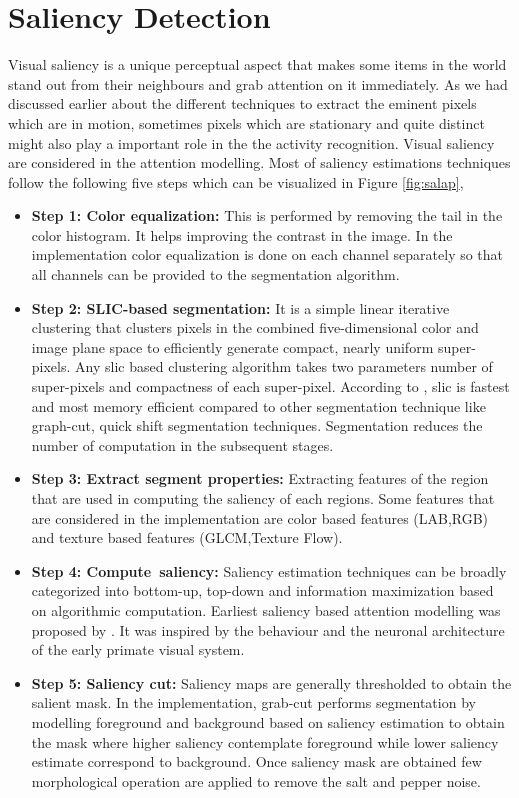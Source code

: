 \section{Saliency Detection}
\label{sec:sal}
Visual saliency is a unique perceptual aspect that makes some items in the world stand out from their neighbours and grab attention on it immediately. As we had discussed earlier about the different techniques to extract the eminent pixels which are in motion, sometimes pixels which are stationary and quite distinct might also play a important role in the the activity recognition. Visual saliency are considered in the attention modelling. Most of saliency estimations techniques follow the following five steps which can be visualized in Figure \ref{fig:salap},
\begin{itemize}
\item{\textbf{Step 1: Color equalization:} This is performed by removing the tail in the color histogram. It helps improving the contrast in the image. In the implementation color equalization is done on each channel separately so that all channels can be provided to the segmentation algorithm.}

\item{ \textbf{Step 2: SLIC-based segmentation:}  It is a simple linear iterative clustering that clusters pixels in the combined five-dimensional color and image plane space to efficiently generate compact, nearly uniform super-pixels. Any slic based clustering algorithm takes two parameters number of super-pixels and compactness of each super-pixel. According to \cite{slic}, slic is fastest and most memory efficient compared to  other segmentation technique like graph-cut, quick shift segmentation techniques. Segmentation reduces the number of computation in the subsequent stages.}

\item{ \textbf{Step 3: Extract segment properties:} Extracting features of the region that are used in computing the saliency of each regions. Some features that are considered in the implementation are color based features (LAB,RGB) and texture based features (GLCM,Texture Flow).}

\item{\textbf{Step 4: Compute~saliency:} Saliency estimation techniques can be broadly categorized into bottom-up, top-down and information maximization based on algorithmic computation. Earliest saliency based attention modelling was proposed by \cite{itti}. It was inspired by the behaviour and the neuronal architecture of the early primate visual system.}

\item{\textbf{Step 5: Saliency cut:} Saliency maps are generally thresholded to obtain the salient mask. In the implementation, grab-cut\citep{grab-cut} performs segmentation by modelling foreground and background based on saliency estimation to obtain the mask where higher saliency  contemplate foreground while lower saliency estimate correspond to background. Once saliency mask are obtained few morphological operation are applied to remove the salt and pepper noise.}
\end{itemize}

